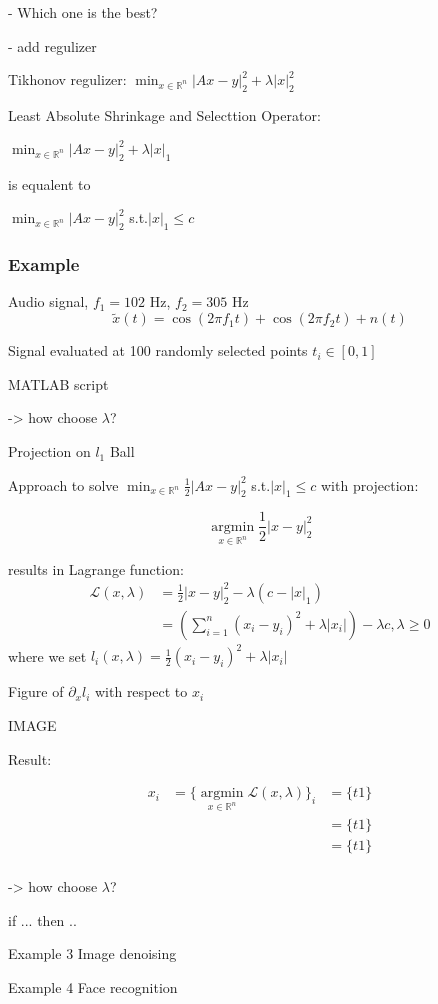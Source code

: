- Which one is the best?

- add regulizer

Tikhonov regulizer:
$\min_{x \in \mathbb{R}^{n}}|Ax-y|_2^2 + \lambda |x|_2^2$

Least Absolute Shrinkage and Selecttion Operator:

$ \min_{x \in \mathbb{R}^{n}}|Ax-y|_2^2 + \lambda |x|_1$

is equalent to


$ \min_{x \in \mathbb{R}^{n}}|Ax-y|_2^2$ s.t.$|x|_1\le c$

\subsubsection{Example}

Audio signal, $f_1=102$ Hz, $f_2=305$ Hz
\begin{equation}
	\tilde{x}(t)=\cos{(2\pi f_1t)}+\cos{(2\pi f_2t)}+n(t)
	\label{eq:audio-signal}
\end{equation}

Signal evaluated at 100 randomly selected points $t_i\in[0,1]$

MATLAB script

-> how choose $\lambda$?


Projection  on $l_1$ Ball

Approach to solve
$\min_{x \in \mathbb{R}^{n}}\frac{1}{2}|Ax-y|_2^2$ s.t.$|x|_1\le c$
with projection:

$$ \underset{ x \in \mathbb{R}^{n}}{\operatorname{argmin}}\frac{1}{2}|x-y|_2^2$$

results in Lagrange  function:
$$
	\begin{aligned}
		\mathcal{L}(x,\lambda) & =\frac{1}{2}|x-y|_2^2-\lambda(c-|x|_1)                          \\
		                       & =(\sum_{i=1}^n(x_i-y_i)^2+\lambda|x_i|)-\lambda c, \lambda\ge 0
	\end{aligned}
$$
where we set
$l_i(x,\lambda) =
	\frac{1}{2}(x_i-y_i)^2+\lambda |x_i|$

Figure of $\partial_xl_i$ with respect to $x_i$

IMAGE

Result:

$$\begin{aligned}
		x_i & = \{\underset{ x \in \mathbb{R}^{n}}{\operatorname{argmin}}\mathcal{L}(x,\lambda)\}_i
		    & = \{t1\}                                                                                         \\
		    &                                                                                       & = \{t1\} \\
		    &                                                                                       & = \{t1\} \\
	\end{aligned}$$

-> how choose $\lambda$?

if ... then ..

Example 3 Image denoising

Example 4 Face recognition


